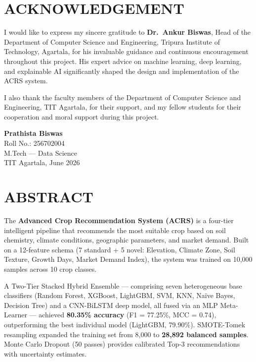 \documentclass[12pt,a4paper,oneside]{report}
\begin{document}
\chapter*{ACKNOWLEDGEMENT}

I would like to express my sincere gratitude to \textbf{Dr.\ Ankur Biswas}, Head of the Department of Computer Science and Engineering, Tripura Institute of Technology, Agartala, for his invaluable guidance and continuous encouragement throughout this project. His expert advice on machine learning, deep learning, and explainable AI significantly shaped the design and implementation of the ACRS system.

I also thank the faculty members of the Department of Computer Science and Engineering, TIT Agartala, for their support, and my fellow students for their cooperation and moral support during this project.

\vspace{2cm}
\noindent\textbf{Prathista Biswas}\\
Roll No.: 256702004\\
M.Tech --- Data Science\\
TIT Agartala, June 2026
\newpage

\chapter*{ABSTRACT}

The \textbf{Advanced Crop Recommendation System (ACRS)} is a four-tier intelligent pipeline that recommends the most suitable crop based on soil chemistry, climate conditions, geographic parameters, and market demand. Built on a 12-feature schema (7 standard + 5 novel: Elevation, Climate Zone, Soil Texture, Growth Days, Market Demand Index), the system was trained on 10,000 samples across 10 crop classes.

A Two-Tier Stacked Hybrid Ensemble --- comprising seven heterogeneous base classifiers (Random Forest, XGBoost, LightGBM, SVM, KNN, Na\"{i}ve Bayes, Decision Tree) and a CNN-BiLSTM deep model, all fused via an MLP Meta-Learner --- achieved \textbf{80.35\% accuracy} (F1 = 77.25\%, MCC = 0.74), outperforming the best individual model (LightGBM, 79.90\%). SMOTE-Tomek resampling expanded the training set from 8,000 to \textbf{28,892 balanced samples}. Monte Carlo Dropout (50 passes) provides calibrated Top-3 recommendations with uncertainty estimates.
\end{document}
